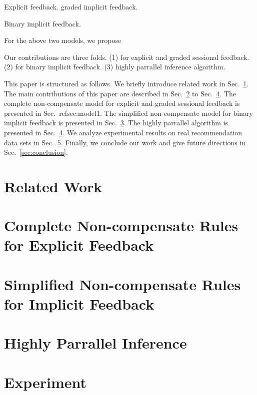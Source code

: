 \documentclass[conference]{IEEEtran}
\begin{document}
Explicit feedback. graded implicit feedback.  

Binary implicit feedback. 

For the above two models, we propose 

Our contributions are three folds. (1) for explicit and graded sessional feedback. (2) for binary implicit feedback. (3) highly parrallel inference algorithm. 

This paper is structured as follows. We briefly introduce related work in Sec.~\ref{sec:relatedwork}. The main contributions of this paper are described in Sec.~\ref{sec:model1} to Sec.~\ref{sec:algorithm}. The complete non-compensate model for explicit and graded sessional feedback is presented in Sec.~ref{sec:model1}. The simplified non-compensate model for binary implicit feedback is presented in Sec.~\ref{sec:model2}. The highly parrallel algorithm is presented in Sec.~\ref{sec:algorithm}. We analyze experimental results on real recommendation data sets in Sec.~\ref{sec:experiment}. Finally, we conclude our work and give future directions in Sec.~\ref{sec:conclusion}. 


\section{Related Work}\label{sec:relatedwork}



\section{Complete Non-compensate Rules for Explicit Feedback}\label{sec:model1}

\section{Simplified Non-compensate Rules for Implicit Feedback}\label{sec:model2}

\section{Highly Parrallel Inference}\label{sec:algorithm}

\section{Experiment}\label{sec:experiment}
\end{document}
